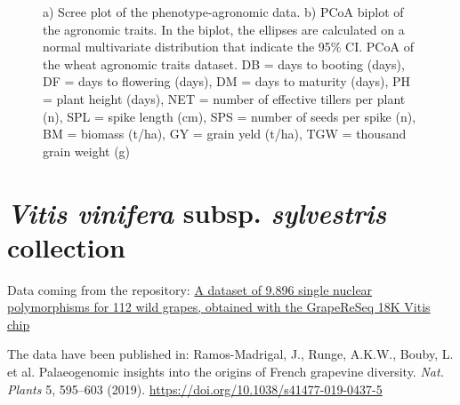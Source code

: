 \documentclass[a4paper,onecolumn,10pt]{article}
\begin{document}
\begin{figure}[H]
    \centering
    \caption{
        a) Scree plot of the phenotype-agronomic data.
        b) PCoA biplot of the agronomic traits.
        In the biplot, the ellipses are calculated on a normal multivariate distribution that indicate the 95\% CI.
        PCoA of the wheat agronomic traits dataset.
        DB = days to booting (days),
        DF = days to flowering (days),
        DM = days to maturity (days),
        PH = plant height (days),
        NET = number of effective tillers per plant (n),
        SPL = spike length (cm),
        SPS = number of seeds per spike (n),
        BM = biomass (t/ha),
        GY = grain yeld (t/ha),
        TGW = thousand grain weight (g)}
    \label{fig:scree_PCA_location}
\end{figure}

\newpage
\section{\textit{Vitis vinifera} subsp. \textit{sylvestris} collection}

Data coming from the repository: \href{https://entrepot.recherche.data.gouv.fr/dataset.xhtml;jsessionid=2f4de81d5749162093ac55d6a7b0?persistentId=doi:10.15454/9RUCEP&version=&q=&fileAccess=&fileTag=&fileSortField=date&fileSortOrder=}{A dataset of 9.896 single nuclear polymorphisms for 112 wild grapes, obtained with the GrapeReSeq 18K Vitis chip}

The data have been published in: Ramos-Madrigal, J., Runge, A.K.W., Bouby, L. et al. Palaeogenomic insights into the origins of French grapevine diversity. \textit{Nat. Plants} 5, 595–603 (2019). \href{https://doi.org/10.1038/s41477-019-0437-5}{https://doi.org/10.1038/s41477-019-0437-5}

\end{document}
